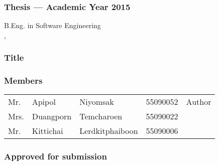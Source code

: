 \thispagestyle{empty}

\begin{flushleft}
\subsubsection{\Large{Thesis --- Academic Year 2015}}
B.Eng. in Software Engineering \\
\IC, \kmitl

\vspace{2cm}

\subsubsection{\Large{Title}}
\dms

\vspace{1cm}
\subsubsection{\Large{Members}}
\begin{tabular}{lllll}
	Mr. & Apipol & Niyomsak & 55090052 & Author \\
	Mrs. & Duangporn & Temcharoen & 55090022 & \\
	Mr. & Kittichai & Lerdkitphaiboon & 55090006 & \\
\end{tabular}
\end{flushleft}

\vfill

\begin{flushright}
\subsubsection{\Large{Approved for submission}}
\vspace{1cm}
\end{flushright}